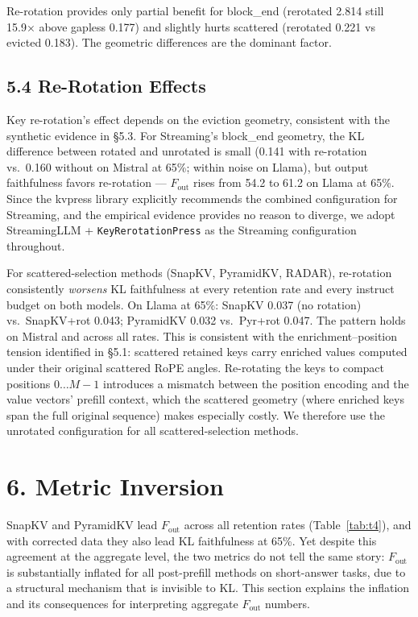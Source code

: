\documentclass[10pt,letterpaper]{article}
\begin{document}
Re-rotation provides only partial benefit for block\_end (rerotated 2.814
still 15.9× above gapless 0.177) and slightly hurts scattered (rerotated 0.221
vs evicted 0.183). The geometric differences are the dominant factor.


\hypertarget{re-rotation-effects}{%
\subsection{5.4 Re-Rotation Effects}\label{re-rotation-effects}}

Key re-rotation's effect depends on the eviction geometry, consistent
with the synthetic evidence in §5.3. For Streaming's block\_end geometry,
the KL difference between rotated and unrotated is small (0.141 with
re-rotation vs.\ 0.160 without on Mistral at 65\%; within noise on
Llama), but output faithfulness favors re-rotation --- \(F_{\text{out}}\) rises
from 54.2 to 61.2 on Llama at 65\%. Since the kvpress library explicitly
recommends the combined configuration for Streaming, and the empirical
evidence provides no reason to diverge, we adopt StreamingLLM +
\texttt{KeyRerotationPress} as the Streaming configuration throughout.

For scattered-selection methods (SnapKV, PyramidKV, RADAR),
re-rotation consistently \emph{worsens} KL faithfulness at every retention
rate and every instruct budget on both models. On Llama at 65\%:
SnapKV 0.037 (no rotation) vs.\ SnapKV+rot 0.043; PyramidKV 0.032 vs.\
Pyr+rot 0.047. The pattern holds on Mistral and across all rates.
This is consistent with the enrichment--position tension identified in §5.1:
scattered retained keys carry enriched values computed under their original
scattered RoPE angles. Re-rotating the keys to compact positions
\(0\ldots M-1\) introduces a mismatch between the position encoding and
the value vectors' prefill context, which the scattered geometry
(where enriched keys span the full original sequence) makes especially
costly. We therefore use the unrotated configuration for all
scattered-selection methods.


\hypertarget{metric-inversion}{%
\section{6. Metric Inversion}\label{metric-inversion}}

SnapKV and PyramidKV lead \(F_{\text{out}}\) across all retention rates
(Table~\ref{tab:t4}), and with corrected data they also lead KL faithfulness at 65\%.
Yet despite this agreement at the aggregate level, the two metrics do not
tell the same story: \(F_{\text{out}}\) is substantially inflated for all
post-prefill methods on short-answer tasks, due to a structural mechanism
that is invisible to KL. This section explains the inflation and its consequences
for interpreting aggregate \(F_{\text{out}}\) numbers.
\end{document}
